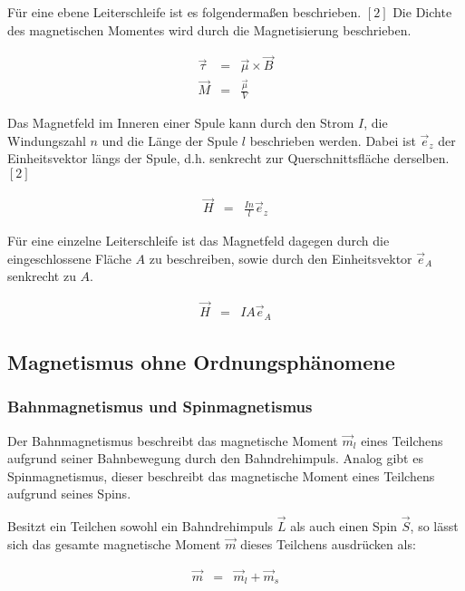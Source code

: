 \documentclass[12pt,a4paper]{scrartcl}
\numberwithin{equation}{section} %
\renewcommand{\[}{} %
\renewcommand{\]}{\noindent} %
\begin{document}
Für eine ebene Leiterschleife ist es folgendermaßen beschrieben. \([2]\)
Die Dichte des magnetischen Momentes wird durch die Magnetisierung
beschrieben.

\[
\begin{eqnarray}
    \vec \tau &=& \vec \mu \times \vec B \\
    \vec M &=& \frac{\vec \mu}{V}
\end{eqnarray}
\]

Das Magnetfeld im Inneren einer Spule kann durch den Strom \(I\), die
Windungszahl \(n\) und die Länge der Spule \(l\) beschrieben werden.
Dabei ist \(\vec e_z\) der Einheitsvektor längs der Spule, d.h.
senkrecht zur Querschnittsfläche derselben. \([2]\)

\[
\begin{eqnarray}
    \vec H &=& \frac{In}{l} \vec e_z \label{H(I)}
\end{eqnarray}
\]

Für eine einzelne Leiterschleife ist das Magnetfeld dagegen durch die
eingeschlossene Fläche \(A\) zu beschreiben, sowie durch den
Einheitsvektor \(\vec e_A\) senkrecht zu \(A\).

\[
\begin{eqnarray}
    \vec H &=& IA \vec e_A
\end{eqnarray}
\]

\hypertarget{magnetismus-ohne-ordnungsphuxe4nomene}{%
\subsection{Magnetismus ohne
Ordnungsphänomene}\label{magnetismus-ohne-ordnungsphuxe4nomene}}

\hypertarget{bahnmagnetismus-und-spinmagnetismus}{%
\subsubsection{Bahnmagnetismus und
Spinmagnetismus}\label{bahnmagnetismus-und-spinmagnetismus}}

Der Bahnmagnetismus beschreibt das magnetische Moment \(\vec m_l\) eines
Teilchens aufgrund seiner Bahnbewegung durch den Bahndrehimpuls. Analog
gibt es Spinmagnetismus, dieser beschreibt das magnetische Moment eines
Teilchens aufgrund seines Spins.

Besitzt ein Teilchen sowohl ein Bahndrehimpuls \(\vec L\) als auch einen
Spin \(\vec S\), so lässt sich das gesamte magnetische Moment
\(\vec{m}\) dieses Teilchens ausdrücken als:

\[
\begin{eqnarray}
    \vec m &=& \vec m_l + \vec m_s
\end{eqnarray}
\]
\end{document}
